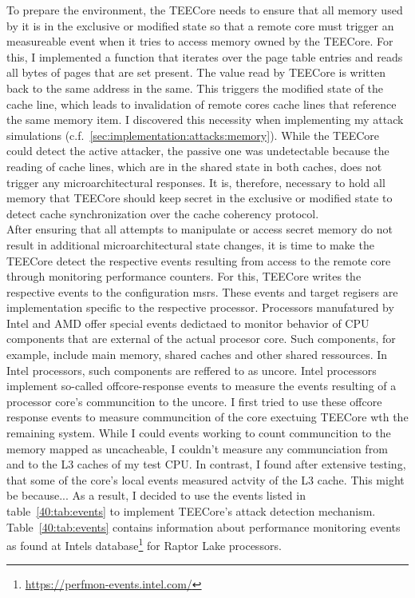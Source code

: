 To prepare the environment, the TEECore needs to ensure that all memory used by
it is in the exclusive or modified state so that a remote core must trigger an
measureable event when it tries to access memory owned by the TEECore. For this,
I implemented a function that iterates over the page table entries and reads all
bytes of pages that are set present. The value read by TEECore is written back
to the same address in the same. This triggers the modified state of the cache
line, which leads to invalidation of remote cores cache lines that reference the
same memory item. I discovered this necessity when implementing my attack
simulations (c.f.~\ref{sec:implementation:attacks:memory}). While the TEECore could detect the active attacker, the passive one
was undetectable because the reading of cache lines, which are in the shared
state in both caches, does not trigger any microarchitectural responses. It is,
therefore, necessary to hold all memory that TEECore should keep secret in
the exclusive or modified state to detect cache synchronization over the cache
coherency protocol.\\

After ensuring that all attempts to manipulate or access secret memory do not
result in additional microarchitectural state changes, it is time to make the
TEECore detect the respective events resulting from access to the remote core
through monitoring performance counters. For this, TEECore writes the respective
events to the configuration \glspl{msr}. These events and target regisers are
implementation specific to the respective processor. Processors manufatured by
Intel and AMD offer special events dedictaed to monitor behavior of CPU
components that are external of the actual procesor core. Such components, for
example, include main memory, shared caches and other shared ressources. In
Intel processors, such components are reffered to as uncore. Intel processors
implement so-called offcore-response events to measure the events resulting of a
processor core's communcition to the uncore. I first tried to use these offcore
response events to measure communcition of the core exectuing TEECore wth the
remaining system. While I could events working to count communcition to the
memory mapped as uncacheable, I couldn't measure any communciation from and to
the L3 caches of my test CPU. In contrast, I found after extensive testing, that
some of the core's local events measured actvity of the L3 cache. This might be
because...  As a result, I decided to use the events
listed in table~\ref{40:tab:events} to implement TEECore's attack detection
mechanism. Table~\ref{40:tab:events} contains information about performance
monitoring events as found at Intels
database\footnote{\url{https://perfmon-events.intel.com/}} for Raptor Lake
processors.

